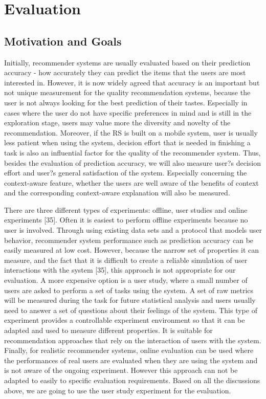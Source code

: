 \chapter{Evaluation}\label{chapter:evaluation}

\section{Motivation and Goals} \label{sec:mg}

Initially, recommender systems are usually evaluated based on their prediction accuracy - how accurately they can predict the items that the users are most interested in. However, it is now widely agreed that accuracy is an important but not unique measurement for the quality recommendation systems, because the user is not always looking for the best prediction of their tastes. Especially in cases where the user do not have specific preferences in mind and is still in the exploration stage, users may value more the diversity and novelty of the recommendation. Moreover, if the RS is built on a mobile system, user is usually less patient when using the system, decision effort that is needed in finishing a task is also an influential factor for the quality of the recommender system. Thus, besides the evaluation of prediction accuracy, we will also measure user?s decision effort and user?s general satisfaction of the system. Especially concerning the context-aware feature,  whether the users are well aware of the benefits of context and the corresponding context-aware explanation will also be measured.

There are three different types of experiments: offline, user studies and online experiments [35]. Often it is easiest to perform offline experiments because no user is involved. Through using existing data sets and a protocol that models user behavior, recommender system performance such as prediction accuracy can be easily measured at low cost. However, because the narrow set of properties it can measure, and the fact that it is difficult to create a reliable simulation of user interactions with the system [35], this approach is not appropriate for our evaluation. A more expensive option is a user study, where a small number of users are asked to perform a set of tasks using the system. A set of raw metrics will be measured during the task for future statistical analysis and users usually need to answer a set of questions about their feelings of the system. This type of experiment provides a controllable experiment environment so that it can be adapted and used to measure different properties. It is suitable for recommendation approaches that rely on the interaction of users with the system. Finally, for realistic recommender systems, online evaluation can be used where the performances of real users are evaluated when they are using the system and is not aware of the ongoing experiment. However this approach can not be adapted to easily to specific evaluation requirements. Based on all the discussions above, we are going to use the user study experiment for the evaluation.

